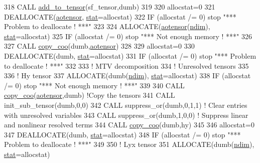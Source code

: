 \begin{DoxyCode}
318     \textcolor{keyword}{CALL }\hyperlink{namespacetensor_aad7cd55f3a4cec4676cc7ca34b05f1a8}{add\_to\_tensor}(sf\_tensor,dumb)
319 
320     allocstat=0
321     \textcolor{keyword}{DEALLOCATE}(\hyperlink{namespaceaotensor__def_a0dc43bc9294a18f2fe57b67489f1702f}{aotensor}, \hyperlink{namespacestat}{stat}=allocstat)
322     \textcolor{keywordflow}{IF} (allocstat /= 0)  stop \textcolor{stringliteral}{"*** Problem to deallocate ! ***"}
323 
324     \textcolor{keyword}{ALLOCATE}(\hyperlink{namespaceaotensor__def_a0dc43bc9294a18f2fe57b67489f1702f}{aotensor}(\hyperlink{namespaceparams_a2323fe1773f086e20c14f266351c482b}{ndim}), \hyperlink{namespacestat}{stat}=allocstat)
325     \textcolor{keywordflow}{IF} (allocstat /= 0) stop \textcolor{stringliteral}{"*** Not enough memory ! ***"}
326 
327     \textcolor{keyword}{CALL }\hyperlink{namespacetensor_a14f95c256cdf137ca0767ddb3c87deea}{copy\_coo}(dumb,\hyperlink{namespaceaotensor__def_a0dc43bc9294a18f2fe57b67489f1702f}{aotensor})
328 
329     allocstat=0
330     \textcolor{keyword}{DEALLOCATE}(dumb, \hyperlink{namespacestat}{stat}=allocstat)
331     \textcolor{keywordflow}{IF} (allocstat /= 0)  stop \textcolor{stringliteral}{"*** Problem to deallocate ! ***"}
332 
333     \textcolor{comment}{! MTV decomposition}
334     \textcolor{comment}{! Unresolved tensors}
335 
336     \textcolor{comment}{! Hy tensor}
337     \textcolor{keyword}{ALLOCATE}(dumb(\hyperlink{namespaceparams_a2323fe1773f086e20c14f266351c482b}{ndim}), \hyperlink{namespacestat}{stat}=allocstat)
338     \textcolor{keywordflow}{IF} (allocstat /= 0) stop \textcolor{stringliteral}{"*** Not enough memory ! ***"}
339 
340     \textcolor{keyword}{CALL }\hyperlink{namespacetensor_a14f95c256cdf137ca0767ddb3c87deea}{copy\_coo}(\hyperlink{namespaceaotensor__def_a0dc43bc9294a18f2fe57b67489f1702f}{aotensor},dumb) \textcolor{comment}{!Copy the tensors}
341     \textcolor{keyword}{CALL }init\_sub\_tensor(dumb,0,0)
342     \textcolor{keyword}{CALL }suppress\_or(dumb,0,1,1) \textcolor{comment}{! Clear entries with unresolved variables}
343     \textcolor{keyword}{CALL }suppress\_or(dumb,1,0,0) \textcolor{comment}{! Suppress linear and nonlinear resolved terms}
344     \textcolor{keyword}{CALL }\hyperlink{namespacetensor_a14f95c256cdf137ca0767ddb3c87deea}{copy\_coo}(dumb,hy)
345 
346     allocstat=0
347     \textcolor{keyword}{DEALLOCATE}(dumb, \hyperlink{namespacestat}{stat}=allocstat)
348     \textcolor{keywordflow}{IF} (allocstat /= 0)  stop \textcolor{stringliteral}{"*** Problem to deallocate ! ***"}
349 
350     \textcolor{comment}{! Lyx tensor}
351     \textcolor{keyword}{ALLOCATE}(dumb(\hyperlink{namespaceparams_a2323fe1773f086e20c14f266351c482b}{ndim}), \hyperlink{namespacestat}{stat}=allocstat)

\end{DoxyCode}
